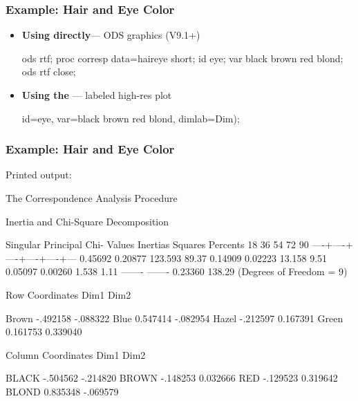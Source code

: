 \begin{frame}[fragile]
  \frametitle{Example: Hair and Eye Color}

  \begin{itemize}
	\item{\large\bfseries Using  directly}--- ODS graphics (V9.1+)
\begin{Input}[baselinestretch=0.9,numbers=none]
ods rtf; 
proc corresp data=haireye short;
  id eye;                         
  var black brown red blond;      
ods rtf close;
\end{Input}
	\item{\large\bfseries Using the }--- labeled high-res plot
\begin{Input}[baselinestretch=0.9,numbers=none]
    id=eye,                     
    var=black brown red blond,  
    dimlab=Dim);                
\end{Input}
  \end{itemize}
\end{frame}

\begin{frame}[fragile]
  \frametitle{Example: Hair and Eye Color}
Printed output:
\begin{Output}[fontsize=\footnotesize,baselinestretch=0.7,gobble=5]
                    The Correspondence Analysis Procedure

                     Inertia and Chi-Square Decomposition

       Singular  Principal Chi-
       Values    Inertias  Squares Percents   18   36   54   72   90
                                           ----+----+----+----+----+---
       0.45692   0.20877   123.593  89.37%
       0.14909   0.02223    13.158   9.51%
       0.05097   0.00260     1.538   1.11%
                 -------   -------
                 0.23360    138.29 (Degrees of Freedom = 9)

                               Row Coordinates
                                     Dim1          Dim2

                      Brown      -.492158      -.088322
                      Blue       0.547414      -.082954
                      Hazel      -.212597      0.167391
                      Green      0.161753      0.339040

                              Column Coordinates
                                     Dim1          Dim2

                      BLACK      -.504562      -.214820
                      BROWN      -.148253      0.032666
                      RED        -.129523      0.319642
                      BLOND      0.835348      -.069579
\end{Output}
\end{frame}

